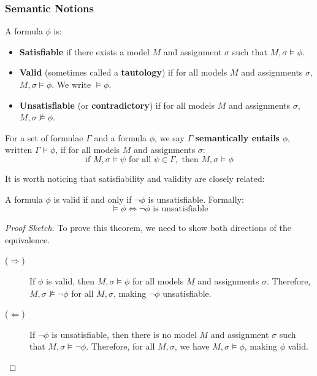\subsubsection{Semantic Notions}
A formula \(\phi\) is:
\begin{itemize}
  \item \textbf{Satisfiable} if there exists a model \(M\) and assignment \(\sigma\) such that \(M, \sigma \models \phi\).
  \item \textbf{Valid} (sometimes called a \textbf{tautology}) if for all models \(M\) and assignments \(\sigma\), \(M, \sigma \models \phi\). We write \(\models \phi\).
  \item \textbf{Unsatisfiable} (or \textbf{contradictory}) if for all models \(M\) and assignments \(\sigma\), \(M, \sigma \not\models \phi\).
\end{itemize}

For a set of formulae \(\Gamma\) and a formula \(\phi\), we say \(\Gamma\) \textbf{semantically entails} \(\phi\), written \(\Gamma \models \phi\), if for all models \(M\) and assignments \(\sigma\):
  \[\text{if } M, \sigma \models \psi \text{ for all } \psi \in \Gamma, \text{ then } M, \sigma \models \phi\]

It is worth noticing that satisfiability and validity are closely related:
\begin{theorem}\label{thm:validity_satisfiability_reduction}
A formula \(\phi\) is valid if and only if \(\neg\phi\) is unsatisfiable. Formally:
\[\models \phi \iff \neg\phi \text{ is unsatisfiable}\]
\end{theorem}

\begin{proof}[Proof Sketch]
To prove this theorem, we need to show both directions of the equivalence.
  \begin{description}
    \item[(\(\Rightarrow\))] If \(\phi\) is valid, then \(M, \sigma \models \phi\) for all models \(M\) and assignments \(\sigma\). Therefore, \(M, \sigma \not\models \neg\phi\) for all \(M, \sigma\), making \(\neg\phi\) unsatisfiable.
    \item[(\(\Leftarrow\))] If \(\neg\phi\) is unsatisfiable, then there is no model \(M\) and assignment \(\sigma\) such that \(M, \sigma \models \neg\phi\). Therefore, for all \(M, \sigma\), we have \(M, \sigma \models \phi\), making \(\phi\) valid.
  \end{description}
\end{proof}


